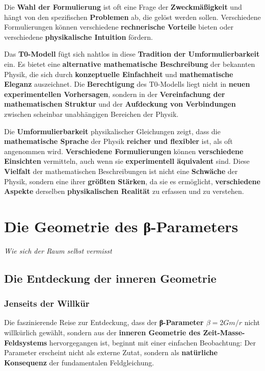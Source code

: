 \documentclass[12pt,a4paper]{report}
\begin{document}
	Die \textbf{Wahl der Formulierung} ist oft eine Frage der \textbf{Zweckmäßigkeit} und hängt von den spezifischen \textbf{Problemen} ab, die gelöst werden sollen. Verschiedene Formulierungen können verschiedene \textbf{rechnerische Vorteile} bieten oder verschiedene \textbf{physikalische Intuition} fördern.
	
	Das \textbf{T0-Modell} fügt sich nahtlos in diese \textbf{Tradition der Umformulierbarkeit} ein. Es bietet eine \textbf{alternative mathematische Beschreibung} der bekannten Physik, die sich durch \textbf{konzeptuelle Einfachheit} und \textbf{mathematische Eleganz} auszeichnet. Die \textbf{Berechtigung} des T0-Modells liegt nicht in \textbf{neuen experimentellen Vorhersagen}, sondern in der \textbf{Vereinfachung der mathematischen Struktur} und der \textbf{Aufdeckung von Verbindungen} zwischen scheinbar unabhängigen Bereichen der Physik.
	
	Die \textbf{Umformulierbarkeit} physikalischer Gleichungen zeigt, dass die \textbf{mathematische Sprache} der Physik \textbf{reicher und flexibler} ist, als oft angenommen wird. \textbf{Verschiedene Formulierungen} können \textbf{verschiedene Einsichten} vermitteln, auch wenn sie \textbf{experimentell äquivalent} sind. Diese \textbf{Vielfalt} der mathematischen Beschreibungen ist nicht eine \textbf{Schwäche} der Physik, sondern eine ihrer \textbf{größten Stärken}, da sie es ermöglicht, \textbf{verschiedene Aspekte} derselben \textbf{physikalischen Realität} zu erfassen und zu verstehen.  
	\chapter{Die Geometrie des β-Parameters}
	\textit{Wie sich der Raum selbst vermisst}
	
	\section{Die Entdeckung der inneren Geometrie}
	
	\subsection{Jenseits der Willkür}
	
	Die faszinierende Reise zur Entdeckung, dass der \textbf{β-Parameter $\beta = 2Gm/r$} nicht willkürlich gewählt, sondern aus der \textbf{inneren Geometrie des Zeit-Masse-Feldsystems} hervorgegangen ist, beginnt mit einer einfachen Beobachtung: Der Parameter erscheint nicht als externe Zutat, sondern als \textbf{natürliche Konsequenz} der fundamentalen Feldgleichung.
	
\end{document}
